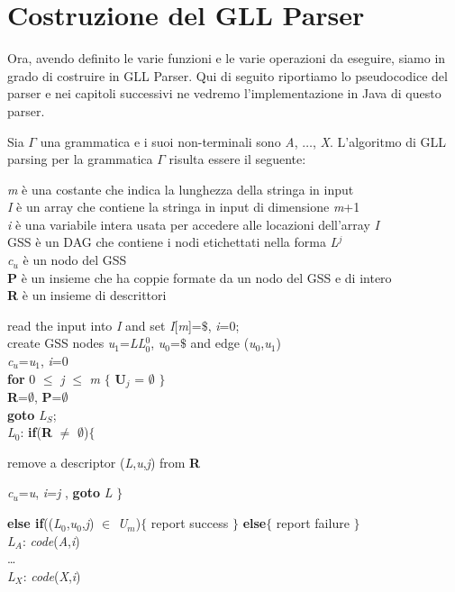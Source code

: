 \section{Costruzione del GLL Parser}
Ora, avendo definito le varie funzioni e le varie operazioni da eseguire, siamo in grado di costruire in GLL Parser. Qui di seguito riportiamo lo pseudocodice del parser e nei capitoli successivi ne vedremo l'implementazione in Java di questo parser.\par 
\vspace{0.2cm}
Sia $\Gamma$ una grammatica \cite{pubblicazione: scott} e i suoi non-terminali sono \textit{A}, $\dots$, \textit{X}. L'algoritmo di GLL parsing per la grammatica $\Gamma$ risulta essere il seguente:\par
\vspace{0.5cm}
\textit{m} è una costante che indica la lunghezza della stringa in input\\
\textit{I} è un array che contiene la stringa in input di dimensione \textit{m}+1\\
\textit{i} è una variabile intera usata per accedere alle locazioni dell'array \textit{I}\\
GSS è un DAG che contiene i nodi etichettati nella forma \textit{L$^{j}$}\\
\textit{c}$_u$ è un nodo del GSS\\
\textbf{P} è un insieme che ha coppie formate da un nodo del GSS e di intero\\
\textbf{R} è un insieme di descrittori \par
\vspace{0.5cm}

read the input into \textit{I} and set \textit{I}[\textit{m}]=$\$$, \textit{i}=0;\\
create GSS nodes \textit{u}$_1$=\textit{L}\textit{L}$_0^{0}$, \textit{u}$_0$=$\$$ and edge (\textit{u}$_0$,\textit{u}$_1$)\\
\textit{c}$_u$=\textit{u}$_1$, \textit{i}=0\\
\textbf{for} 0 $\le$ \textit{j} $\le$ \textit{m} $\{$ \textbf{U$_j$} = $\emptyset$ $\}$\\
\textbf{R}=$\emptyset$, \textbf{P}=$\emptyset$\\
\textbf{goto} \textit{L}$_S$;\\
\textit{L}$_0$: \textbf{if}(\textbf{R} $\ne$ $\emptyset$)$\{$\par
\hspace{2cm} remove a descriptor (\textit{L},\textit{u},\textit{j}) from \textbf{R}\par
\hspace{2cm} \textit{c}$_u$=\textit{u}, \textit{i}=\textit{j} , \textbf{goto} \textit{L} $\}$\par
\hspace{0.1cm} \textbf{else if}((\textit{L}$_0$,\textit{u}$_0$,\textit{j}) $\in$ \textit{U}$_m$)$\{$ report success $\}$ \textbf{else}$\{$ report failure $\}$\\
\textit{L}$_A$: \textit{code}(\textit{A},\textit{i})\\
\dots \\
\textit{L}$_X$: \textit{code}(\textit{X},\textit{i})